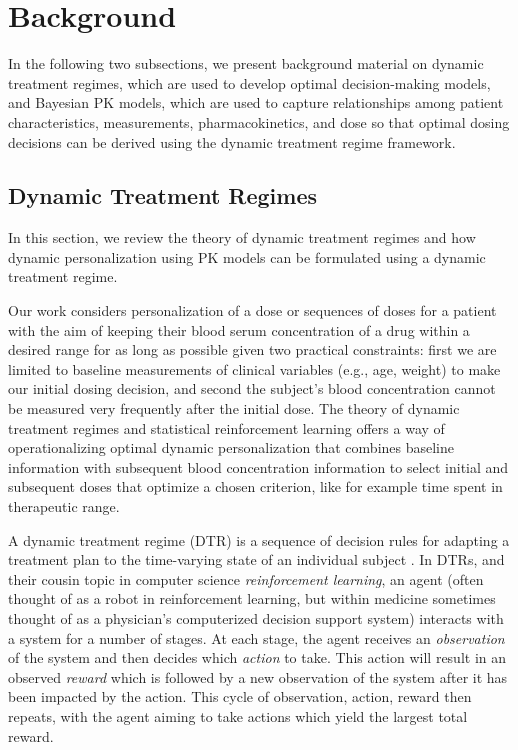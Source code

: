 \section{Background}\label{ss:background}

In the following two subsections, we present background material on dynamic treatment regimes, which are used to develop optimal decision-making models, and Bayesian PK models, which are used to capture relationships among patient characteristics, measurements, pharmacokinetics, and dose so that optimal dosing decisions can be derived using the dynamic treatment regime framework.

\subsection{Dynamic Treatment Regimes}

In this section, we review the theory of dynamic treatment regimes and how dynamic personalization using PK models can be formulated using a dynamic treatment regime.

Our work considers personalization of a dose or sequences of doses for a patient with the aim of keeping their blood serum concentration of a drug within a desired range for as long as possible given two practical constraints: first we are limited to baseline measurements of clinical variables (e.g., age, weight) to make our initial dosing decision, and second the subject’s blood concentration cannot be measured very frequently after the initial dose. The theory of dynamic treatment regimes and statistical reinforcement learning offers a way of operationalizing optimal dynamic personalization that combines baseline information with subsequent blood concentration information to select initial and subsequent doses that optimize a chosen criterion, like for example time spent in therapeutic range.

A dynamic treatment regime (DTR) is a sequence of decision rules for adapting a treatment plan to the time-varying state of an individual subject \cite{chakraborty2013statistical}. In DTRs, and their cousin topic in computer science \textit{reinforcement learning}, an agent (often thought of as a robot in reinforcement learning, but within medicine sometimes thought of as a physician’s computerized decision support system) interacts with a system for a number of stages. At each stage, the agent receives an \textit{observation} of the system and then decides which \textit{action} to take.  This action will result in an observed \textit{reward} which is followed by a new observation of the system after it has been impacted by the action.  This cycle of observation, action, reward then repeats, with the agent aiming to take actions which yield the largest total reward.

